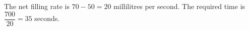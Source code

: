 The net filling rate is $70-50=20$ millilitres per second. The required time is $\dfrac{700}{20}=\boxed{35}$ seconds.
